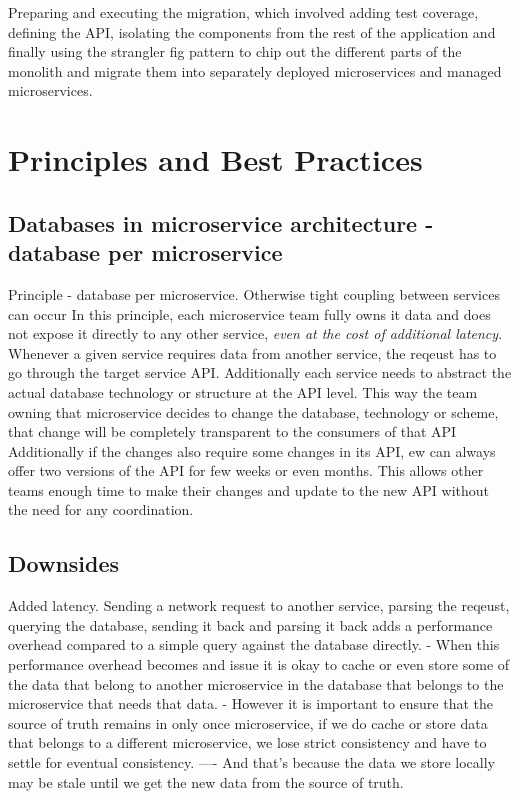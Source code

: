 \documentclass[a4paper, 11pt]{book}
\begin{document}
    Preparing and executing the migration,
    which involved adding test coverage,
    defining the API,
    isolating the components from the rest of the application and finally using the strangler fig pattern to chip out the different parts of
    the monolith and migrate them into separately deployed microservices and managed microservices.

    \section{Principles and Best Practices}

    \subsection{Databases in microservice architecture - database per microservice}
    Principle - database per microservice. Otherwise tight coupling between services can occur
    In this principle, each microservice team fully owns it data and does not expose it directly to any other service, \textit{even at the cost of additional latency}.
    Whenever a given service requires data from another service, the reqeust has to go through the target service API.
    Additionally each service needs to abstract the actual database technology or structure at the API level.
    This way the team owning that microservice decides to change the database, technology or scheme, that change will be completely transparent to the consumers of that API
    Additionally if the changes also require some changes in its API, ew can always offer two versions of the API for few weeks or even months.
    This allows other teams enough time to make their changes and update to the new API without the need for any coordination.

    \subsection{Downsides}
    Added latency.
    Sending a network request to another service, parsing the reqeust, querying the database, sending it back and parsing it back
    adds a performance overhead compared to a simple query against the database directly.
    - When this performance overhead becomes and issue it is okay to cache or even store some of the data that belong to another microservice in the database that belongs to the microservice that needs that data.
    - However it is important to ensure that the source of truth remains in only once microservice, if we do cache or store data that belongs to a different microservice, we lose strict consistency and have to settle for eventual consistency.
    ---- And that's because the data we store locally may be stale until we get the new data from the source of truth.
\end{document}
